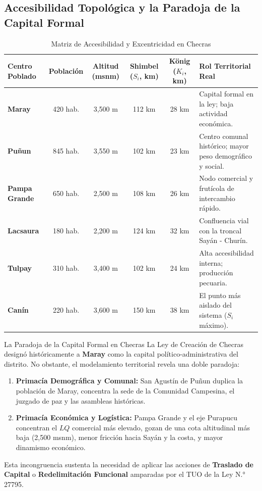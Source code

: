 \documentclass[11pt,a4paper]{article}
\begin{document}
\subsection{Accesibilidad Topológica y la Paradoja de la Capital Formal}
\begin{table}[htbp]
\centering
\small
\caption{Matriz de Accesibilidad y Excentricidad en Checras}
\begin{tabularx}{\textwidth}{lccccX}
\toprule
\textbf{Centro Poblado} & \textbf{Población} & \textbf{Altitud (msnm)} & \textbf{Shimbel ($S_i$, km)} & \textbf{König ($K_i$, km)} & \textbf{Rol Territorial Real} \\
\midrule
\textbf{Maray} & 420 hab. & 3,500 m & 112 km & 28 km & Capital formal en la ley; baja actividad económica. \\
\addlinespace
\textbf{Puñun} & 845 hab. & 3,550 m & 102 km & 23 km & Centro comunal histórico; mayor peso demográfico y social. \\
\addlinespace
\textbf{Pampa Grande} & 650 hab. & 2,500 m & 108 km & 26 km & Nodo comercial y frutícola de intercambio rápido. \\
\addlinespace
\textbf{Lacsaura} & 180 hab. & 2,200 m & 124 km & 32 km & Confluencia vial con la troncal Sayán - Churín. \\
\addlinespace
\textbf{Tulpay} & 310 hab. & 3,400 m & 102 km & 24 km & Alta accesibilidad interna; producción pecuaria. \\
\addlinespace
\textbf{Canín} & 220 hab. & 3,600 m & 150 km & 38 km & El punto más aislado del sistema ($S_i$ máximo). \\
\bottomrule
\end{tabularx}
\end{table}

\begin{conceptbox}{La Paradoja de la Capital Formal en Checras}
La Ley de Creación de Checras designó históricamente a \textbf{Maray} como la capital político-administrativa del distrito. No obstante, el modelamiento territorial revela una doble paradoja:
\begin{enumerate}
    \item \textbf{Primacía Demográfica y Comunal:} San Agustín de Puñun duplica la población de Maray, concentra la sede de la Comunidad Campesina, el juzgado de paz y las asambleas históricas.
    \item \textbf{Primacía Económica y Logística:} Pampa Grande y el eje Purapucu concentran el $LQ$ comercial más elevado, gozan de una cota altitudinal más baja (2,500 msnm), menor fricción hacia Sayán y la costa, y mayor dinamismo económico.
\end{enumerate}
Esta incongruencia sustenta la necesidad de aplicar las acciones de \textbf{Traslado de Capital} o \textbf{Redelimitación Funcional} amparadas por el TUO de la Ley N.° 27795.
\end{conceptbox}
\end{document}
